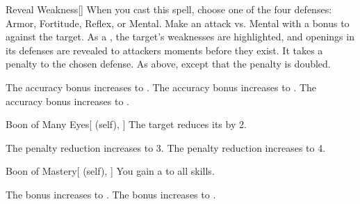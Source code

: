 \lowercase{\hypertarget{spell:Reveal Weakness}{}}\label{spell:Reveal Weakness}
\begin{freeability}[Rank 2]{\hypertarget{spell:Reveal Weakness}{Reveal Weakness}}[]
When you cast this spell, choose one of the four defenses: Armor, Fortitude, Reflex, or Mental.
Make an attack vs. Mental with a  bonus to  against the target.
\hit As a , the target's weaknesses are highlighted, and openings in its defenses are revealed to attackers moments before they exist.
It takes a  penalty to the chosen defense.
\crit As above, except that the penalty is doubled.

\rankline
{} The accuracy bonus increases to .
 The accuracy bonus increases to .
 The accuracy bonus increases to .
\end{freeability}
\vspace{0.25em}



\lowercase{\hypertarget{spell:Boon of Many Eyes}{}}\label{spell:Boon of Many Eyes}
\begin{attuneability}[Rank 3]{\hypertarget{spell:Boon of Many Eyes}{Boon of Many Eyes}}[ (self), ]
The target reduces its  by 2.

\rankline
{} The penalty reduction increases to 3.
 The penalty reduction increases to 4.
\end{attuneability}
\vspace{0.25em}



\lowercase{\hypertarget{spell:Boon of Mastery}{}}\label{spell:Boon of Mastery}
\begin{attuneability}[Rank 3]{\hypertarget{spell:Boon of Mastery}{Boon of Mastery}}[ (self), ]
You gain a   to all skills.

\rankline
{} The bonus increases to .
 The bonus increases to .
\end{attuneability}
\vspace{0.25em}



